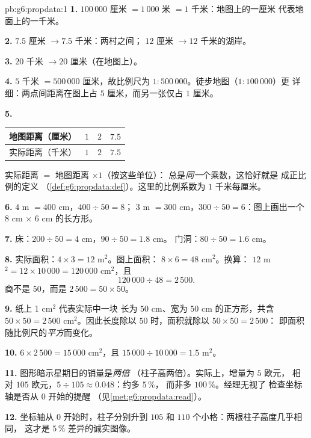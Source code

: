 \begin{solution}{pb:g6:propdata:1}
\textbf{1.} $100\,000$ 厘米 $= 1\,000$ 米 $= 1$ 千米：地图上的一厘米
代表地面上的一千米。

\textbf{2.} $7.5$ 厘米 $\rightarrow 7.5$ 千米：两村之间；
$12$ 厘米 $\rightarrow 12$ 千米的湖岸。

\textbf{3.} $20$ 千米 $\rightarrow 20$ 厘米（在地图上）。

\textbf{4.} $5$ 千米 $= 500\,000$ 厘米，故比例尺为
$1:500\,000$。徒步地图（$1:100\,000$）更
详细：两点间距离在图上占 $5$ 厘米，而另一张仅占
$1$ 厘米。

\textbf{5.}
\begin{center}
\renewcommand{\arraystretch}{1.2}
\begin{tabular}{l|ccc}
地图距离（厘米） & $1$ & $2$ & $7.5$ \\
\hline
实际距离（千米） & $1$ & $2$ & $7.5$ \\
\end{tabular}
\end{center}
实际距离 $=$ 地图距离 $\times 1$（按这些单位）：
总是\emph{同一}个乘数，这恰好就是
成正比例的定义
（\cref{def:g6:propdata:def}）。这里的比例系数为 $1$
千米每厘米。

\textbf{6.} $4$ m $= 400$ cm，$400 \div 50 = 8$；
$3$ m $= 300$ cm，$300 \div 50 = 6$：图上画出一个
$8$ cm $\times$ $6$ cm 的长方形。

\textbf{7.} 床：$200 \div 50 = 4$ cm，$90 \div 50 = 1.8$ cm。
门洞：$80 \div 50 = 1.6$ cm。

\textbf{8.} 实际面积：$4 \times 3 = 12$ m$^2$。图上面积：
$8 \times 6 = 48$ cm$^2$。换算：
$12$ m$^2 = 12 \times 10\,000 = 120\,000$ cm$^2$，且
\[
120\,000 \div 48 = 2\,500 .
\]
商不是 $50$，而是 $2\,500 = 50 \times 50$。

\textbf{9.} 纸上 1 cm$^2$ 代表实际中一块
长为 $50$ cm、宽为 $50$ cm 的正方形，共含
$50 \times 50 = 2\,500$ cm$^2$。因此长度除以
$50$ 时，面积就除以 $50 \times 50 = 2\,500$：
即面积随比例尺的\emph{平方}而变化。

\textbf{10.} $6 \times 2\,500 = 15\,000$ cm$^2$，且
$15\,000 \div 10\,000 = 1.5$ m$^2$。

\textbf{11.} 图形暗示星期日的销量是\emph{两倍}
（柱子高两倍）。实际上，增量为 $5$ 欧元，
相对 $105$ 欧元，$5 \div 105 \approx 0.048$：约多 $5\,\%$，
而非多 $100\,\%$。经理无视了
检查坐标轴是否从 $0$ 开始的提醒
（见\cref{met:g6:propdata:read}）。

\textbf{12.} 坐标轴从 $0$ 开始时，柱子分别升到 $105$ 和
$110$ 个小格：两根柱子高度几乎相同，
这才是 $5\,\%$ 差异的诚实图像。


\end{solution}
